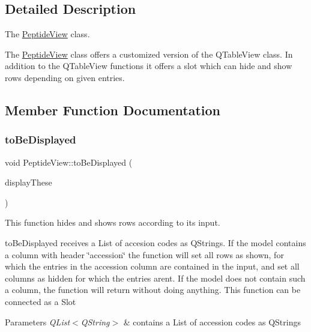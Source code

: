\subsection{Detailed Description}
The \mbox{\hyperlink{class_peptide_view}{Peptide\+View}} class. 

The \mbox{\hyperlink{class_peptide_view}{Peptide\+View}} class offers a customized version of the Q\+Table\+View class. In addition to the Q\+Table\+View functions it offers a slot which can hide and show rows depending on given entries. 

\subsection{Member Function Documentation}
\mbox{\label{class_peptide_view_a44ff37ec18e1e1c61c8747b6fe79e076}} 
\subsubsection{\texorpdfstring{to\+Be\+Displayed}{toBeDisplayed}}
{\footnotesize\ttfamily void Peptide\+View\+::to\+Be\+Displayed (\begin{DoxyParamCaption}\item[{Q\+List$<$ Q\+String $>$}]{display\+These }\end{DoxyParamCaption})\hspace{0.3cm}{\ttfamily [slot]}}



This function hides and shows rows according to its input. 

to\+Be\+Displayed receives a List of accesion codes as Q\+Strings. If the model contains a column with header \char`\"{}accession\char`\"{} the function will set all rows as shown, for which the entries in the accession column are contained in the input, and set all columns as hidden for which the entries aren\textquotesingle{}t. If the model does not contain such a column, the function will return without doing anything. This function can be connected as a Slot


\begin{DoxyParams}{Parameters}
{\em Q\+List$<$\+Q\+String$>$} & contains a List of accession codes as Q\+Strings \\
\hline
\end{DoxyParams}
\mbox{\label{class_peptide_view_ab96162d2cb5e04591e6225505afceefe}} 
